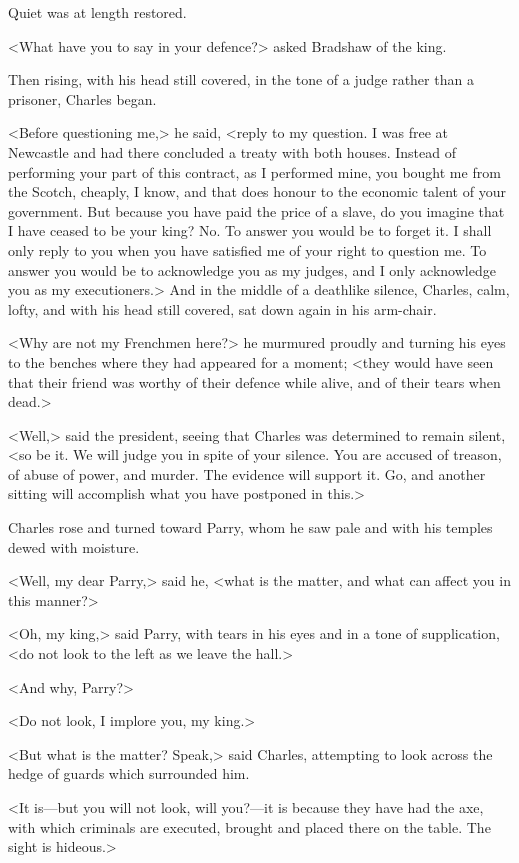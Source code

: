 Quiet was at length restored.

<What have you to say in your defence?> asked Bradshaw of the king.

Then rising, with his head still covered, in the tone of a judge rather than a prisoner, Charles began.

<Before questioning me,> he said, <reply to my question. I was free at Newcastle and had there concluded a treaty with both houses. Instead of performing your part of this contract, as I performed mine, you bought me from the Scotch, cheaply, I know, and that does honour to the economic talent of your government. But because you have paid the price of a slave, do you imagine that I have ceased to be your king? No. To answer you would be to forget it. I shall only reply to you when you have satisfied me of your right to question me. To answer you would be to acknowledge you as my judges, and I only acknowledge you as my executioners.> And in the middle of a deathlike silence, Charles, calm, lofty, and with his head still covered, sat down again in his arm-chair.

<Why are not my Frenchmen here?> he murmured proudly and turning his eyes to the benches where they had appeared for a moment; <they would have seen that their friend was worthy of their defence while alive, and of their tears when dead.>

<Well,> said the president, seeing that Charles was determined to remain silent, <so be it. We will judge you in spite of your silence. You are accused of treason, of abuse of power, and murder. The evidence will support it. Go, and another sitting will accomplish what you have postponed in this.>

Charles rose and turned toward Parry, whom he saw pale and with his temples dewed with moisture.

<Well, my dear Parry,> said he, <what is the matter, and what can affect you in this manner?>

<Oh, my king,> said Parry, with tears in his eyes and in a tone of supplication, <do not look to the left as we leave the hall.>

<And why, Parry?>

<Do not look, I implore you, my king.>

<But what is the matter? Speak,> said Charles, attempting to look across the hedge of guards which surrounded him.

<It is—but you will not look, will you?—it is because they have had the axe, with which criminals are executed, brought and placed there on the table. The sight is hideous.>

